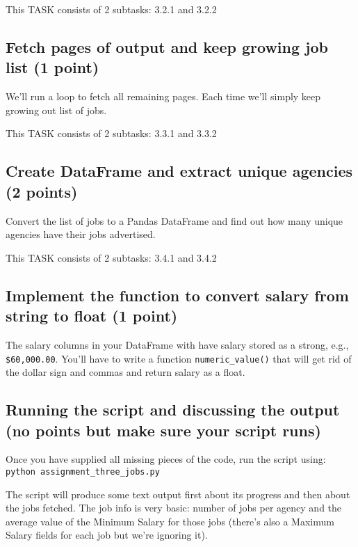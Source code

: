 \documentclass{article}
\begin{document}
This TASK consists of 2 subtasks: 3.2.1 and 3.2.2

\subsection{Fetch pages of output and keep growing job list (1 point)}

We'll run a loop to fetch all remaining pages. Each time we'll simply keep growing out list of jobs.

This TASK consists of 2 subtasks: 3.3.1 and 3.3.2

\subsection{Create DataFrame and extract unique agencies (2 points)}

Convert the list of jobs to a Pandas DataFrame and find out how many unique agencies have their jobs advertised.

This TASK consists of 2 subtasks: 3.4.1 and 3.4.2

\subsection{Implement the function to convert salary from string to float (1 point)}

The salary columns in your DataFrame with have salary stored as a strong, e.g., \verb#$60,000.00#. You'll have
to write a function \verb#numeric_value()# that will get rid of the dollar sign and commas and return salary as a float.

\subsection{Running the script and discussing the output (no points but make sure your script runs)}

Once you have supplied all missing pieces of the code, run the script using:\\
{\tt python assignment\_three\_jobs.py}

The script will produce some text output first about its progress and then about the jobs fetched.
The job info is very basic: number of jobs per agency and the average value of the Minimum Salary
for those jobs (there's also a Maximum Salary fields for each job but we're ignoring it).
\end{document}

